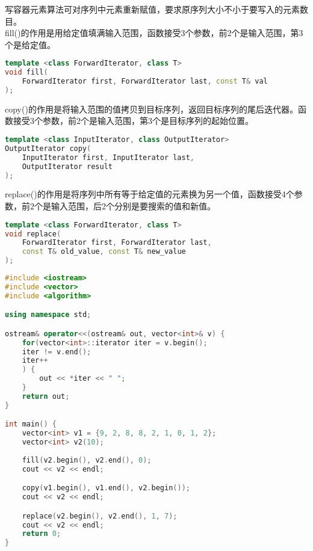 写容器元素算法可对序列中元素重新赋值，要求原序列大小不小于要写入的元素数目。 \\

fill()的作用是用给定值填满输入范围，函数接受3个参数，前2个是输入范围，第3个是给定值。

\vspace{-0.5cm}

\begin{lstlisting}[language=C++]
template <class ForwardIterator, class T>
void fill(
	ForwardIterator first, ForwardIterator last, const T& val
);
\end{lstlisting}

copy()的作用是将输入范围的值拷贝到目标序列，返回目标序列的尾后迭代器。函数接受3个参数，前2个是输入范围，第3个是目标序列的起始位置。

\vspace{-0.5cm}

\begin{lstlisting}[language=C++]
template <class InputIterator, class OutputIterator>
OutputIterator copy(
	InputIterator first, InputIterator last,
	OutputIterator result
);
\end{lstlisting}

replace()的作用是将序列中所有等于给定值的元素换为另一个值，函数接受4个参数，前2个是输入范围，后2个分别是要搜索的值和新值。

\vspace{-0.5cm}

\begin{lstlisting}[language=C++]
template <class ForwardIterator, class T>
void replace(
	ForwardIterator first, ForwardIterator last, 
	const T& old_value, const T& new_value
);
\end{lstlisting}

\vspace{0.5cm}


\begin{lstlisting}[language=C++]
#include <iostream>
#include <vector>
#include <algorithm>

using namespace std;

ostream& operator<<(ostream& out, vector<int>& v) {
	for(vector<int>::iterator iter = v.begin(); 
	iter != v.end(); 
	iter++
	) {
		out << *iter << " ";
	}
	return out;
}

int main() {
	vector<int> v1 = {9, 2, 8, 8, 2, 1, 0, 1, 2};
	vector<int> v2(10);
	
	fill(v2.begin(), v2.end(), 0);
	cout << v2 << endl;

	copy(v1.begin(), v1.end(), v2.begin());
	cout << v2 << endl;

	replace(v2.begin(), v2.end(), 1, 7);
	cout << v2 << endl;
	return 0;
}
\end{lstlisting}

